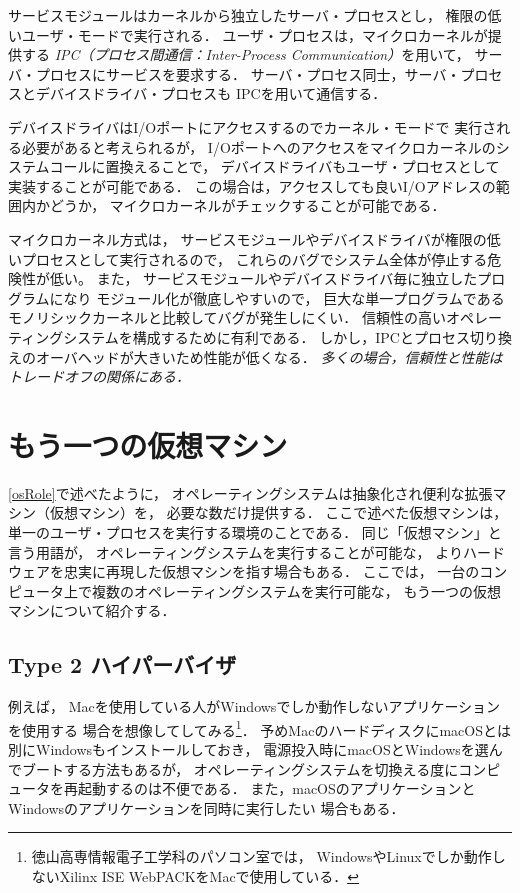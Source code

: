 サービスモジュールはカーネルから独立したサーバ・プロセスとし，
権限の低いユーザ・モードで実行される．
ユーザ・プロセスは，マイクロカーネルが提供する
\emph{IPC（プロセス間通信：Inter-Process Communication）}を用いて，
サーバ・プロセスにサービスを要求する．
サーバ・プロセス同士，サーバ・プロセスとデバイスドライバ・プロセスも
IPCを用いて通信する．

デバイスドライバはI/Oポートにアクセスするのでカーネル・モードで
実行される必要があると考えられるが，
I/Oポートへのアクセスをマイクロカーネルのシステムコールに置換えることで，
デバイスドライバもユーザ・プロセスとして実装することが可能である．
この場合は，アクセスしても良いI/Oアドレスの範囲内かどうか，
マイクロカーネルがチェックすることが可能である．

マイクロカーネル方式は，
サービスモジュールやデバイスドライバが権限の低いプロセスとして実行されるので，
これらのバグでシステム全体が停止する危険性が低い。
また，
サービスモジュールやデバイスドライバ毎に独立したプログラムになり
モジュール化が徹底しやすいので，
巨大な単一プログラムであるモノリシックカーネルと比較してバグが発生しにくい．
信頼性の高いオペレーティングシステムを構成するために有利である．
しかし，IPCとプロセス切り換えのオーバヘッドが大きいため性能が低くなる．
\emph{多くの場合，信頼性と性能はトレードオフの関係にある．}

\section{もう一つの仮想マシン}
\ref{osRole}で述べたように，
オペレーティングシステムは抽象化され便利な拡張マシン（仮想マシン）を，
必要な数だけ提供する．
ここで述べた仮想マシンは，単一のユーザ・プロセスを実行する環境のことである．
同じ「仮想マシン」と言う用語が，
オペレーティングシステムを実行することが可能な，
よりハードウェアを忠実に再現した仮想マシンを指す場合もある．
ここでは，
一台のコンピュータ上で複数のオペレーティングシステムを実行可能な，
もう一つの仮想マシンについて紹介する．

\subsection{Type 2 ハイパーバイザ}
例えば，
Macを使用している人がWindowsでしか動作しないアプリケーションを使用する
場合を想像してしてみる\footnote{
  徳山高専情報電子工学科のパソコン室では，
  WindowsやLinuxでしか動作しないXilinx ISE WebPACKをMacで使用している．}．
予めMacのハードディスクにmacOSとは別にWindowsもインストールしておき，
電源投入時にmacOSとWindowsを選んでブートする方法もあるが，
オペレーティングシステムを切換える度にコンピュータを再起動するのは不便である．
また，macOSのアプリケーションとWindowsのアプリケーションを同時に実行したい
場合もある．

